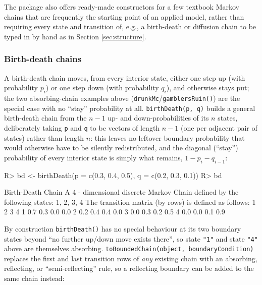 \documentclass[
  nojss]{jss}
\begin{document}
The package also offers ready-made constructors for a few textbook Markov
chains that are frequently the starting point of an applied model, rather
than requiring every state and transition of, e.g., a birth-death or
diffusion chain to be typed in by hand as in
Section \ref{sec:structure}.

\subsubsection{Birth-death chains}\label{birth-death-chains}

A birth-death chain moves, from every interior state, either one step up
(with probability \(p_i\)) or one step down (with probability \(q_i\)), and
otherwise stays put; the two absorbing-chain examples above
(\texttt{drunkMc}/\texttt{gamblersRuin()}) are the special case with no ``stay'' probability
at all. \texttt{birthDeath(p,\ q)} builds a general birth-death chain from the \(n-1\)
up- and down-probabilities of its \(n\) states, deliberately taking \texttt{p} and
\texttt{q} to be vectors of length \(n-1\) (one per adjacent pair of states) rather
than length \(n\): this leaves no leftover boundary probability that would
otherwise have to be silently redistributed, and the diagonal (``stay'')
probability of every interior state is simply what remains,
\(1-p_i-q_{i-1}\):

\begin{CodeChunk}
\begin{CodeInput}
R> bd <- birthDeath(p = c(0.3, 0.4, 0.5), q = c(0.2, 0.3, 0.1))
R> bd
\end{CodeInput}
\begin{CodeOutput}
Birth-Death Chain 
 A  4 - dimensional discrete Markov Chain defined by the following states: 
 1, 2, 3, 4 
 The transition matrix  (by rows)  is defined as follows: 
    1   2   3   4
1 0.7 0.3 0.0 0.0
2 0.2 0.4 0.4 0.0
3 0.0 0.3 0.2 0.5
4 0.0 0.0 0.1 0.9
\end{CodeOutput}
\end{CodeChunk}

By construction \texttt{birthDeath()} has no special behaviour at its two boundary
states beyond ``no further up/down move exists there'', so state \texttt{"1"} and
state \texttt{"4"} above are themselves absorbing. \texttt{toBoundedChain(object,\ boundaryCondition)} replaces the first and last transition rows of \emph{any}
existing chain with an absorbing, reflecting, or ``semi-reflecting'' rule,
so a reflecting boundary can be added to the same chain instead:
\end{document}
